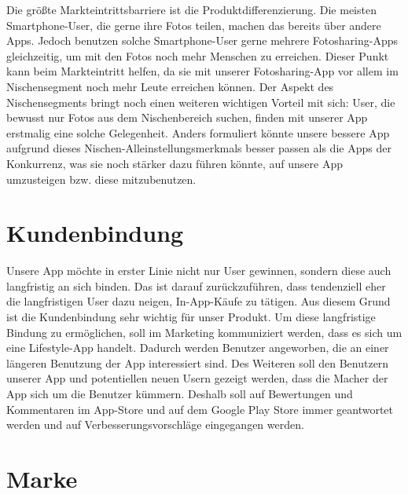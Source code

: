 Die größte Markteintrittsbarriere ist die Produktdifferenzierung. Die meisten Smartphone-User, die gerne ihre Fotos teilen, machen das bereits über andere Apps. Jedoch benutzen solche Smartphone-User gerne mehrere Fotosharing-Apps gleichzeitig, um mit den Fotos noch mehr Menschen zu erreichen. Dieser Punkt kann beim Markteintritt helfen, da sie mit unserer Fotosharing-App vor allem im Nischensegment noch mehr Leute erreichen können. Der Aspekt des Nischensegments bringt noch einen weiteren wichtigen Vorteil mit sich: User, die bewusst nur Fotos aus dem Nischenbereich suchen, finden mit unserer App erstmalig eine solche Gelegenheit. Anders formuliert könnte unsere bessere App aufgrund dieses Nischen-Alleinstellungsmerkmals besser passen als die Apps der Konkurrenz, was sie noch stärker dazu führen könnte, auf unsere App umzusteigen bzw. diese mitzubenutzen.


\section{Kundenbindung}

Unsere App möchte in erster Linie nicht nur User gewinnen, sondern diese auch langfristig an sich binden. Das ist darauf zurückzuführen, dass tendenziell eher die langfristigen User dazu neigen, In-App-Käufe zu tätigen. Aus diesem Grund ist die Kundenbindung sehr wichtig für unser Produkt. Um diese langfristige Bindung zu ermöglichen, soll im Marketing kommuniziert werden, dass es sich um eine Lifestyle-App handelt. Dadurch werden Benutzer angeworben, die an einer längeren Benutzung der App interessiert sind.
Des Weiteren soll den Benutzern unserer App und potentiellen neuen Usern gezeigt werden, dass die Macher der App sich um die Benutzer kümmern. Deshalb soll auf Bewertungen und Kommentaren im App-Store und auf dem Google Play Store immer geantwortet werden und auf Verbesserungsvorschläge eingegangen werden.

\section{Marke}

